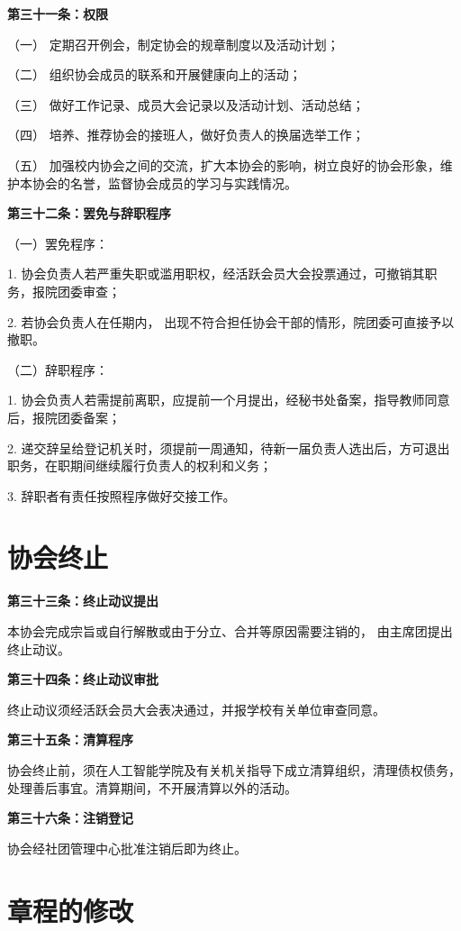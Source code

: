 \documentclass{mjsart}
\begin{document}
\textbf{第三十一条：权限}

（一） 定期召开例会，制定协会的规章制度以及活动计划；

（二） 组织协会成员的联系和开展健康向上的活动；

（三） 做好工作记录、成员大会记录以及活动计划、活动总结；

（四） 培养、推荐协会的接班人，做好负责人的换届选举工作；

（五） 加强校内协会之间的交流，扩大本协会的影响，树立良好的协会形象，维护本协会的名誉，监督协会成员的学习与实践情况。

\textbf{第三十二条：罢免与辞职程序}

（一）罢免程序：

1. 协会负责人若严重失职或滥用职权，经活跃会员大会投票通过，可撤销其职务，报院团委审查；

2. 若协会负责人在任期内， 出现不符合担任协会干部的情形，院团委可直接予以撤职。

（二）辞职程序：

1. 协会负责人若需提前离职，应提前一个月提出，经秘书处备案，指导教师同意后，报院团委备案；

2. 递交辞呈给登记机关时，须提前一周通知，待新一届负责人选出后，方可退出职务，在职期间继续履行负责人的权利和义务；

3. 辞职者有责任按照程序做好交接工作。

\section{协会终止}

\textbf{第三十三条：终止动议提出}

本协会完成宗旨或自行解散或由于分立、合并等原因需要注销的， 由主席团提出终止动议。

\textbf{第三十四条：终止动议审批}

终止动议须经活跃会员大会表决通过，并报学校有关单位审查同意。

\textbf{第三十五条：清算程序}

协会终止前，须在人工智能学院及有关机关指导下成立清算组织，清理债权债务，处理善后事宜。清算期间，不开展清算以外的活动。

\textbf{第三十六条：注销登记}

协会经社团管理中心批准注销后即为终止。

\section{章程的修改}
\end{document}
